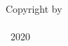 \thispagestyle{empty}

\hfill

\vfill
\begin{center}
	\hfill
	\vfill
	
	\noindent Copyright by \\ \medskip
	\myName \\
	\textcopyright\ 2020
\end{center}